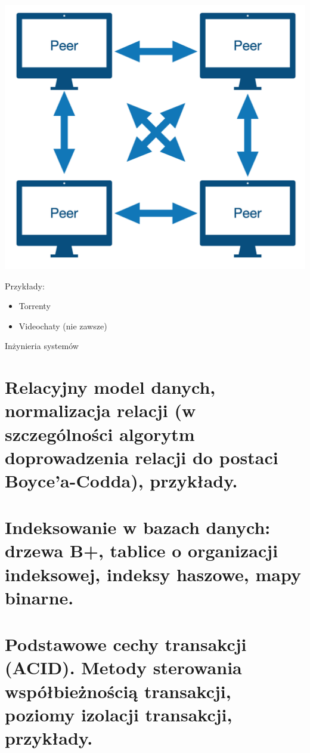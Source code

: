 \documentclass[12pt]{article}
\begin{document}
            \begin{center}
                \includegraphics[scale=0.30]{patterns/peer2peer.png}
            \end{center}

            Przykłady:
            \begin{itemize}
                \item Torrenty
                \item Videochaty (nie zawsze)
            \end{itemize}

    \newpage

    {\Large Inżynieria systemów}

    \section{Relacyjny model danych, normalizacja relacji (w szczególności algorytm doprowadzenia relacji do postaci Boyce’a-Codda), przykłady.}
    \section{Indeksowanie w bazach danych: drzewa B+, tablice o organizacji indeksowej, indeksy haszowe, mapy binarne.}


    \newpage
    
    \section{Podstawowe cechy transakcji (ACID). Metody sterowania współbieżnością transakcji, poziomy izolacji transakcji, przykłady.}
    
\end{document}
